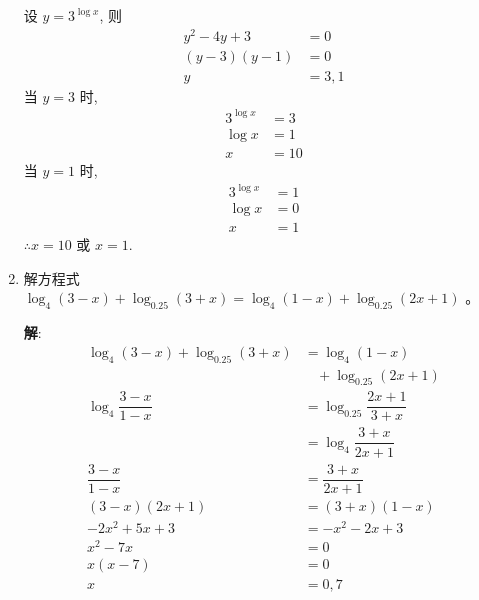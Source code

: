 \documentclass{report}
\newcommand{\sol}{\vspace{0.2cm}\textbf{解}:}
\begin{document}
\begin{multicols*}{2}
\begin{enumerate}[leftmargin=*]
              设 $y = 3^{\log x}$, 则
              \begin{align*}
                  y^2 - 4y + 3   & = 0    \\
                  (y - 3)(y - 1) & = 0    \\
                  y              & = 3, 1
              \end{align*}
              当 $y = 3$ 时,
              \begin{align*}
                  3^{\log x} & = 3  \\
                  \log x     & = 1  \\
                  x          & = 10
              \end{align*}
              当 $y = 1$ 时,
              \begin{align*}
                  3^{\log x} & = 1 \\
                  \log x     & = 0 \\
                  x          & = 1
              \end{align*}
              $\therefore x = 10$ 或 $x = 1$.

        \item 解方程式 $\log _4(3-x)+\log _{0.25}(3+x)=\log _4(1-x)+\log _{0.25}(2 x+1)$ 。

              \sol{}
              \begin{align*}
                  \log_4(3 - x) + \log_{0.25}(3 + x) & = \log_4(1 - x)                    \\
                                                     & \ \ \ \ + \log_{0.25}(2x + 1)      \\
                  \log_4\dfrac{3-x}{1-x}             & = \log_{0.25}\dfrac{2x + 1}{3 + x} \\
                                                     & = \log_4\dfrac{3 + x}{2x + 1}      \\
                  \dfrac{3 - x}{1 - x}               & = \dfrac{3 + x}{2x + 1}            \\
                  (3 - x)(2x + 1)                    & = (3 + x)(1 - x)                   \\
                  -2x^2 + 5x + 3                     & = -x^2 - 2x + 3                    \\
                  x^2 - 7x                           & = 0                                \\
                  x(x - 7)                           & = 0                                \\
                  x                                  & = 0, 7
              \end{align*}
    \end{enumerate}


\end{multicols*}
\end{document}
